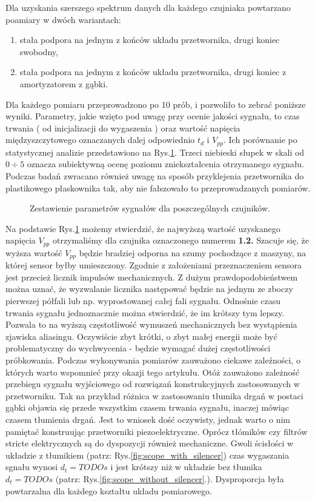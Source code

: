 Dla uzyskania szerszego spektrum danych dla każdego czujniaka powtarzano poamiary w dwóch wariantach: 
\begin{enumerate}
\item stała podpora na jednym z końców układu przetwornika, drugi koniec swobodny,
\item stała podpora na jednym z końców układu przetwornika, drugi koniec z amortyzatorem z gąbki.
\end{enumerate}
Dla każdego pomiaru przeprowadzono po 10 prób, i pozwoliło to zebrać poniższe wyniki. Parametry, jakie wzięto pod uwagę przy ocenie jakości sygnału, to czas trwania ( od inicjalizacji do wygaszenia ) oraz wartość napięcia międzyszczytowego oznaczanych dalej odpowiednio $t_d$ i $V_{pp}$. Ich porównanie po statystycznej analizie przedstawiono na Rys.\ref{fig:sensor_statistic}. Trzeci niebieski słupek w skali od $0\div5$ oznacza subiektywną ocenę poziomu zniekształcenia otrzymanego sygnału. Podczas badań zwracano również uwagę na sposób przyklejenia przetwornika do plastikowego płaskownika tak, aby nie fałszowało to przeprowadzanych pomiarów. 

\begin{figure}[htbp]
\centering
{}%
\caption{Zestawienie parametrów sygnałów dla poszczególnych czujników.}
\label{fig:sensor_statistic}
\end{figure}

Na podstawie Rys.\ref{fig:sensor_statistic} możemy stwierdzić, że najwyższą wartość uzyskanego napięcia $V_{pp}$ otrzymaliśmy dla czujnika oznaczonego numerem \textbf{1.2.} Szacuje się, że wyższa wartość $V_{pp}$ będzie bradziej odporna na szumy pochodzące z maszyny, na której sensor byłby umieszczony. Zgodnie z założeniami przeznaczeniem sensora jest przecież licznik impulsów mechanicznych. Z dużym prawdopodobieństwem można uznać, że wyzwalanie licznika następować będzie na jednym ze zboczy pierwszej półfali lub np. wyprostowanej całej fali sygnału. 
\indent Odnośnie czasu trwania sygnału jednoznacznie można stwierdzić, że im krótszy tym lepszy. Pozwala to na wyższą częstotliwość wymuszeń mechanicznych bez wystąpienia zjawiska aliasingu. Oczywiście zbyt krótki, o zbyt małej energii może być problematyczny do wychwycenia - będzie wymagać dużej częstotliwości próbkowania.
\indent Podczas wykonywania pomiarów zauważono ciekawe zaleźności, o których warto wspomnieć przy okazji tego artykułu. Otóż zauważono zależność przebiegu sygnału wyjściowego od rozwiązań konstrukcyjnych zastosowanych w przetworniku. Tak na przykład różnica w zastosowaniu tłumika drgań w postaci gąbki objawia się przede wszystkim czasem trwania sygnału, inaczej mówiąc czasem tłumienia drgań. Jest to wniosek dość oczywisty, jednak warto o nim pamiętać konstruując przetworniki piezoelektryczne. Oprócz tłómików czy filtrów stricte elektrycznych są do dyspozycji również mechaniczne. Gwoli ścisłości w układzie z tłumikiem (patrz: Rys.\ref{fig:scope_with_silencer}) czas wygaszania sgnału wynosi $d_t = TODOs$ i jest krótszy niż w układzie bez tłumika $d_t = TODOs$ (patrz: Rys.\ref{fig:scope_without_silencer}.). Dysproporcja była powtarzalna dla każdego kształtu układu pomiarowego.

